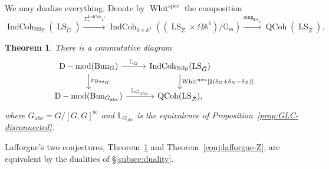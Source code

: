 \documentclass[11pt]{amsart}
\newcommand{\bG}{\mathbb{G}}
\newcommand{\bL}{\mathbb{L}}
\newcommand{\bA}{\mathbb{A}}
\newcommand{\spec}{\mathrm{spec}}
\newcommand{\Bun}{{\mathrm{Bun}}}
\newcommand{\Whit}{\operatorname{Whit}}
\newcommand{\abc}{{\mathrm{abc}}}
\newcommand{\Nilp}{\mathrm{Nilp}}
\newcommand{\sing}{\operatorname{sing}}
\DeclareMathOperator{\QCoh}{QCoh}
\DeclareMathOperator{\Dmod}{D-mod}
\DeclareMathOperator{\IndCoh}{IndCoh}
\DeclareMathOperator{\LS}{LS}
\newtheorem{thm}{Theorem}[section]
\theoremstyle{remark}
\theoremstyle{definition}
\begin{document}
We may dualize everything. Denote by $\Whit^\spec$ the composition
\begin{equation}\label{eq:defn-of-whit^spec}
\IndCoh_\Nilp(\LS_{\check G})\xrightarrow{\Sigma^{\IndCoh}_*\iota^!}\IndCoh_{0\times\bA^1}((\LS_{\check Z}\times\Omega\bA^1)/\bG_m)\xrightarrow{\sing_{\LS_{\check Z}}}\QCoh(\LS_{\check Z}).
\end{equation}
\begin{thm}\label{thm:laf1}
    There is a commutative diagram
    \[
    \begin{tikzcd}
        \Dmod(\Bun_G)\arrow{r}{\mathbb L_G}\arrow{d}{\pi_{\Bun_G!}}&\IndCoh_\Nilp(\LS_{\check G})\arrow{d}{\Whit^\spec[2(\delta_G+\delta_N-\delta_Z)]}\\
        \Dmod(\Bun_{G_{\mathrm{abc}}})\arrow{r}{\mathbb L_{G_{\mathrm{abc}}}}&\QCoh(\LS_{\check Z}),
    \end{tikzcd}
    \]
    where $G_{\mathrm{abc}}=G/[G,G]^{\mathrm{sc}}$ and $\bL_{G_\abc}$ is the equivalence of Proposition~\ref{prop:GLC-disconnected}.
\end{thm}
Lafforgue's two conjectures, Theorem~\ref{thm:laf1} and Theorem~\ref{conj:lafforgue-Z}, are equivalent by the dualities of \S\ref{subsec:duality}.
\end{document}
